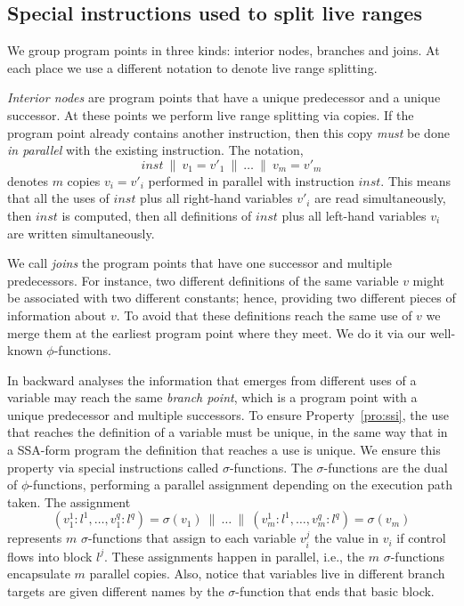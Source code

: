 \subsection{Special instructions used to split live ranges}
\label{sub:split}

We group program points in three kinds:
interior nodes, branches and joins.
At each place we use a different notation to denote live range splitting.

{\em Interior nodes} are program points that have a unique predecessor and a unique successor.
At these points we perform live range splitting via copies.
If the program point already contains another instruction, then this copy \emph{must} be done \emph{in parallel} with the existing instruction.
The notation, \[inst \ \parallel\  v_1=v'_1 \ \parallel\  \dots \ \parallel\  v_m=v'_m\] denotes $m$ copies $v_i=v'_i$ performed in parallel with
instruction $inst$.
This means that all the uses of $inst$ plus all right-hand variables $v'_i$ are read simultaneously, then $inst$ is computed, then all definitions of $inst$ plus all left-hand variables $v_i$ are written simultaneously.


We call {\em joins} the program points that have one successor and multiple predecessors.
For instance, two different definitions of the same variable $v$ might be associated with two different constants; hence, providing two different pieces of information about $v$.
To avoid that these definitions reach the same use of $v$ we merge them at the earliest program point where they meet.
We do it via our well-known $\phi$-functions.

In backward analyses the information that emerges from different uses of a variable may reach the same {\em branch point}, which is a program point with a unique predecessor and multiple successors.
To ensure Property~\ref{pro:ssi}, the use that reaches the definition of a
variable must be unique, in the same way that in a SSA-form program the definition that reaches a use is unique.
We ensure this property via special instructions called $\sigma$-functions.
The $\sigma$-functions are the dual of $\phi$-functions, performing a parallel assignment depending on the execution path taken.
The assignment \[(v_1^1:l^1, \ldots, v_1^q:l^q) = \sigma(v_1) \ \parallel\  \dots \ \parallel\  (v_m^1:l^1, \ldots, v_m^q:l^q) = \sigma(v_m)\] represents $m$ $\sigma$-functions that assign to each variable $v_i^j$ the value in $v_i$ if control flows into block $l^j$.
These assignments happen in parallel, i.e., the $m$ $\sigma$-functions encapsulate $m$ parallel copies.
Also, notice that variables live in different branch targets are given
different names by the $\sigma$-function that ends that basic block.

